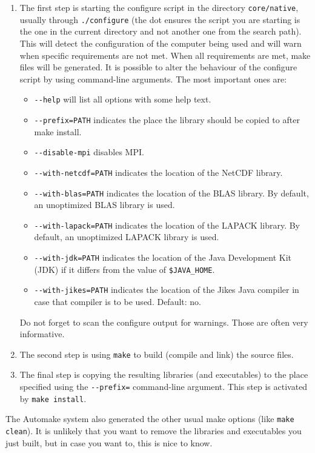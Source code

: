 \begin{enumerate}
        \item The first step is starting the configure script in the directory \verb|core/native|, usually through \verb|./configure| (the dot ensures the script you are starting is the one in the current directory and not another one from the search path). This will detect the configuration of the computer being used and will warn when specific requirements are not met. When all requirements are met, make files will be generated. It is possible to alter the behaviour of the configure script by using command-line arguments. The most important ones are: 
	\begin{itemize}
		\item \verb|--help| will list all options with some help text.
		\item \verb|--prefix=PATH| indicates the place the library should be copied to after make install.
		\item \verb|--disable-mpi| disables MPI.
		\item \verb|--with-netcdf=PATH| indicates the location of the NetCDF library.
		\item \verb|--with-blas=PATH| indicates the location of the BLAS library. By default, an unoptimized BLAS library is used.
		\item \verb|--with-lapack=PATH| indicates the location of the LAPACK library. By default, an unoptimized LAPACK library is used.
		\item \verb|--with-jdk=PATH| indicates the location of the Java Development Kit (JDK) if it differs from the value of \verb|$JAVA_HOME|.
		\item \verb|--with-jikes=PATH| indicates the location of the Jikes Java compiler in case that compiler is to be used. Default: no.
	\end{itemize}
	Do not forget to scan the configure output for warnings. Those are often very informative. 
\item The second step is using \verb|make| to build (compile and link) the source files.
\item The final step is copying the resulting libraries (and executables) to the place specified using the \verb|--prefix=| command-line argument. This step is activated by \verb|make install|. 
\end{enumerate}

The Automake system also generated the other usual make options (like \verb|make clean|). It is unlikely that you want to remove the libraries and executables you just built, but in case you want to, this is nice to know. 

